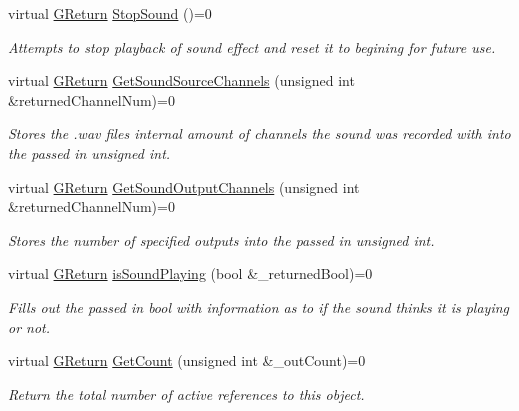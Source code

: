 \begin{DoxyCompactItemize}
virtual \mbox{\hyperlink{namespace_g_w_a67a839e3df7ea8a5c5686613a7a3de21}{G\+Return}} \mbox{\hyperlink{class_g_w_1_1_a_u_d_i_o_1_1_g_sound_adb9e958fc6f853a37d0d84a7fcbe806c}{Stop\+Sound}} ()=0
\begin{DoxyCompactList}\small\item\em Attempts to stop playback of sound effect and reset it to begining for future use. \end{DoxyCompactList}\item 
virtual \mbox{\hyperlink{namespace_g_w_a67a839e3df7ea8a5c5686613a7a3de21}{G\+Return}} \mbox{\hyperlink{class_g_w_1_1_a_u_d_i_o_1_1_g_sound_acca8a7684851e32f4022006fd9eacf6c}{Get\+Sound\+Source\+Channels}} (unsigned int \&returned\+Channel\+Num)=0
\begin{DoxyCompactList}\small\item\em Stores the .wav files internal amount of channels the sound was recorded with into the passed in unsigned int. \end{DoxyCompactList}\item 
virtual \mbox{\hyperlink{namespace_g_w_a67a839e3df7ea8a5c5686613a7a3de21}{G\+Return}} \mbox{\hyperlink{class_g_w_1_1_a_u_d_i_o_1_1_g_sound_a9dcb3529b8819eedfd40e865a3bc611f}{Get\+Sound\+Output\+Channels}} (unsigned int \&returned\+Channel\+Num)=0
\begin{DoxyCompactList}\small\item\em Stores the number of specified outputs into the passed in unsigned int. \end{DoxyCompactList}\item 
virtual \mbox{\hyperlink{namespace_g_w_a67a839e3df7ea8a5c5686613a7a3de21}{G\+Return}} \mbox{\hyperlink{class_g_w_1_1_a_u_d_i_o_1_1_g_sound_a904241837e93254806b2518f7da24ba9}{is\+Sound\+Playing}} (bool \&\+\_\+returned\+Bool)=0
\begin{DoxyCompactList}\small\item\em Fills out the passed in bool with information as to if the sound thinks it is playing or not. \end{DoxyCompactList}\item 
virtual \mbox{\hyperlink{namespace_g_w_a67a839e3df7ea8a5c5686613a7a3de21}{G\+Return}} \mbox{\hyperlink{class_g_w_1_1_a_u_d_i_o_1_1_g_sound_afbac022010da2fc1a917ece2803a36a4}{Get\+Count}} (unsigned int \&\+\_\+out\+Count)=0
\begin{DoxyCompactList}\small\item\em Return the total number of active references to this object. \end{DoxyCompactList}\item 

\end{DoxyCompactItemize}
